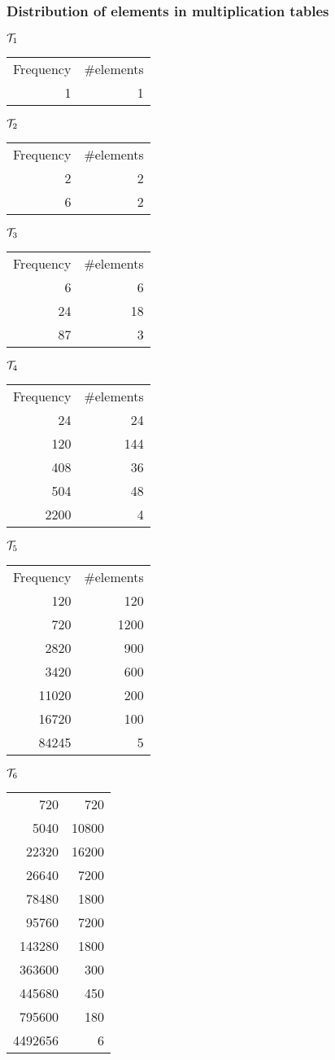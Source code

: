 \documentclass{beamer}
\newcommand{\cT}{{\cal T}}
\newcommand{\jump}{\vskip6pt}
\begin{document}
\begin{frame}
\frametitle{Distribution of elements in multiplication tables}
$\cT_{1}$
\begin{tabular}{r|r}
Frequency & \#elements\\
1 & 1\\
\end{tabular}
\jump
$\cT_{2}$
\begin{tabular}{r|r}
Frequency & \#elements\\
2 & 2\\
6 & 2\\
\end{tabular}
\jump
$\cT_{3}$
\begin{tabular}{r|r}
Frequency & \#elements\\
6 & 6\\
24 & 18\\
87 & 3\\
\end{tabular}
\jump
$\cT_{4}$
\begin{tabular}{r|r}
Frequency & \#elements\\
24 & 24\\
120 & 144\\
408 & 36\\
504 & 48\\
2200 & 4\\
\end{tabular}


\end{frame}


\begin{frame}
$\cT_5$
\begin{tabular}{r|r}
Frequency & \#elements\\
120 & 120\\
720 & 1200\\
2820 & 900\\
3420 & 600\\
11020 & 200\\
16720 & 100\\
84245 & 5\\
\end{tabular}
\jump
$\cT_6$
\begin{tabular}{r|r}
\hline
720 & 720\\
5040 & 10800\\
22320 & 16200\\
26640 & 7200\\
78480 & 1800\\
95760 & 7200\\
143280 & 1800\\
363600 & 300\\
445680 & 450\\
795600 & 180\\
4492656 & 6\\
\end{tabular}


\end{frame}
\end{document}
